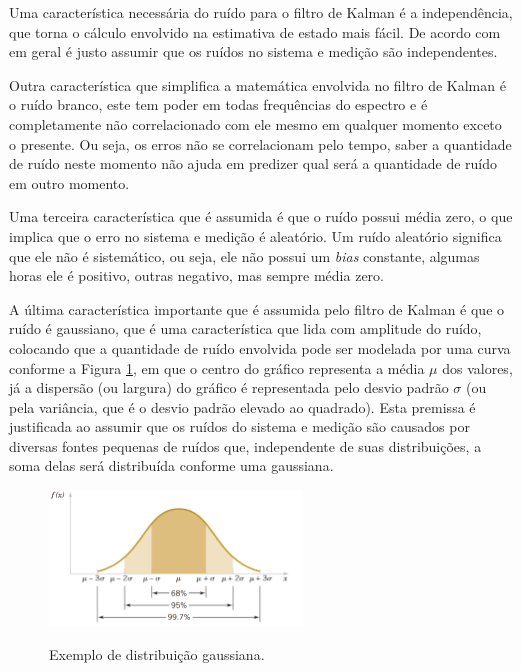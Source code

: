 \documentclass[acronym, symbols, table, deposito]{fei}
\begin{document}
				Uma característica necessária do ruído para o filtro de Kalman é a independência, que torna o cálculo envolvido na estimativa de estado mais fácil. De acordo com \textcite{phdthesisNegenborn} em geral é justo assumir que os ruídos no sistema e medição são independentes.
				
				Outra característica que simplifica a matemática envolvida no filtro de Kalman é o ruído branco, este tem poder em todas frequências do espectro e é completamente não correlacionado com ele mesmo em qualquer momento exceto o presente. Ou seja, os erros não se correlacionam pelo tempo, saber a quantidade de ruído neste momento não ajuda em predizer qual será a quantidade de ruído em outro momento.
				
				Uma terceira característica que é assumida é que o ruído possui média zero, o que implica que o erro no sistema e medição é aleatório. Um ruído aleatório significa que ele não é sistemático, ou seja, ele não possui um \textit{bias} constante, algumas horas ele é positivo, outras negativo, mas sempre média zero.
				
				A última característica importante que é assumida pelo filtro de Kalman é que o ruído é gaussiano, que é uma característica que lida com amplitude do ruído, colocando que a quantidade de ruído envolvida pode ser modelada por uma curva conforme a Figura \ref{fig:distribuicao_gaussiana}, em que o centro do gráfico representa a média $\mu$ dos valores, já a dispersão (ou largura) do gráfico é representada pelo desvio padrão $\sigma$ (ou pela variância, que é o desvio padrão elevado ao quadrado). Esta premissa é justificada ao assumir que os ruídos do sistema e medição são causados por diversas fontes pequenas de ruídos que, independente de suas distribuições, a soma delas será distribuída conforme uma gaussiana.
				
				\begin{figure}[!htb]
					\centering
					\caption{Exemplo de distribuição gaussiana.} 
					\includegraphics[width=0.6\textwidth]{distribuicao_gaussiana.png}
					\label{fig:distribuicao_gaussiana}
				\end{figure}
			
\end{document}
